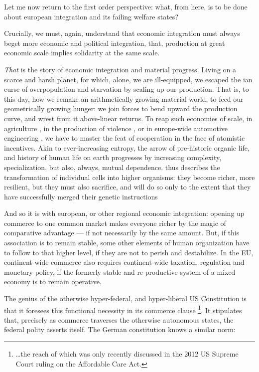 \documentclass[11pt,a4paper,oneside]{article}
\begin{document}
Let me now return to the first order perspective: 
what, from here, is to be done about european integration and its failing welfare states?

Crucially, we must, again, understand that economic integration must always beget more economic and political integration, that, production at great economic scale implies solidarity at the same scale.

\emph{That} is the story of economic integration and material progress. 
Living on a scarce and harsh planet, for which, alone, we are ill-equipped, we escaped the \citeauthor{Malthus1798}ian curse of overpopulation and starvation by scaling up our production. 
That is, to this day, how we remake an arithmetically growing material world, to feed our geometrically growing hunger: 
we join forces to bend upward the production curve, and wrest from it above-linear returns. 
To reap such economies of scale, in agriculture \citep{Diamond1997}, in the production of violence \citep{Tilly-1985-aa}, or in europe-wide automotive engineering \citep{Krugman-1980-aa}, we have to master the feat of cooperation in the face of atomistic incentives. 
Akin to ever-increasing entropy, the arrow of pre-historic organic life, and history of human life on earth progresses by increasing complexity, specialization, but also, always, mutual dependence. 
\citeauthor{Wright1994} thus describes the transformation of individual cells into higher organisms: 
they become richer, more resilient, but they must also sacrifice, and will do so only to the extent that they have successfully merged their genetic instructions \citeyearpar[Chapter 7, 8]{Wright1994}

And so it is with european, or other regional economic integration: 
opening up commerce to one common market makes everyone richer by the magic of comparative advantage --- if not necessarily by the same amount. 
But, if this association is to remain stable, some other elements of human organization have to follow to that higher level, if they are not to perish and destabilize. 
In the \gls{EU}, continent-wide commerce also requires continent-wide taxation, regulation and monetary policy, if the formerly stable and re-productive system of a mixed economy is to remain operative.

The genius of the otherwise hyper-federal, and hyper-liberal US Constitution is that it foresees this functional necessity in its commerce clause
\footnote{
	\ldots the reach of which was only recently discussed in the 2012 US Supreme Court ruling on the Affordable Care Act.
}.
It stipulates that, precisely as commerce traverses the otherwise autonomous states, the federal polity asserts itself. 
The German constitution knows a similar norm:
\end{document}
